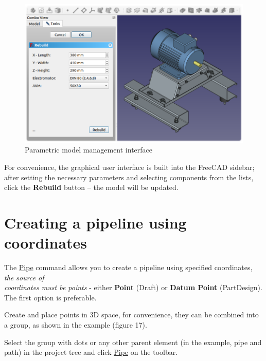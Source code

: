 \documentclass[a4paper,12pt]{article}
\begin{document}
\begin{figure}[htp]
	\centering
	\includegraphics[width=1\textwidth]{img/example_mc.png}
	\caption{Parametric model management interface}
	\label{sec:example_mc}
\end{figure}

For convenience, the graphical user interface is built into the FreeCAD sidebar; after setting the necessary parameters and selecting components from the lists, click the \textbf{Rebuild} button -- the model will be updated.

\pagebreak




\section{Creating a pipeline using coordinates}

The \hyperref[sec:9]{Pipe} command allows you to create a pipeline using specified coordinates, \emph{the source of\\coordinates must be points} - either \textbf{Point} (Draft) or \textbf{Datum Point} (PartDesign). The first option is preferable.

Create and place points in 3D space, for convenience, they can be combined into a group, as shown in the example (figure 17).

Select the group with dots or any other parent element (in the example, pipe and path) in the project tree and click \hyperref[sec:9]{Pipe} on the toolbar.
\end{document}
